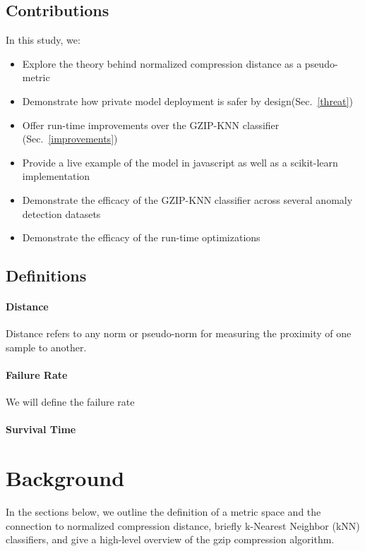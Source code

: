 \documentclass[conference]{IEEEtran}
\begin{document}
\subsection{Contributions}

In this study, we:

\begin{itemize}
    \item Explore the theory behind normalized compression distance as a pseudo-metric
    \item Demonstrate how private model deployment is safer by design(Sec.~\ref{threat})
    \item Offer run-time improvements over the GZIP-KNN classifier (Sec.~\ref{improvements})
    \item Provide a live example of the model in javascript as well as a scikit-learn implementation
    \item Demonstrate the efficacy of the GZIP-KNN classifier across several anomaly detection datasets
    \item Demonstrate the efficacy of the run-time optimizations
\end{itemize}

\subsection{Definitions}
\paragraph{Distance}
Distance refers to any norm or pseudo-norm for measuring the proximity of one sample to another. 
\paragraph{Failure Rate}
We will define the failure rate
\paragraph{Survival Time}

\section{Background}

In the sections below, we outline the definition of a metric space and the connection to normalized compression distance, briefly k-Nearest Neighbor (kNN) classifiers, and give a high-level overview of the gzip compression algorithm.
\end{document}
